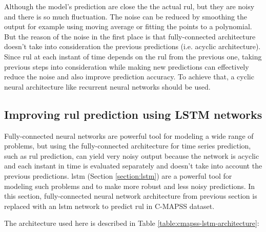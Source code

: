 Although the model's prediction are close the the actual \acrshort{rul}, but they are noisy and there is so much fluctuation. The noise can be reduced by smoothing the output for example using moving average or fitting the points to a polynomial. But the reason of the noise in the first place is that fully-connected architecture doesn't take into consideration the previous predictions (i.e. acyclic architecture). Since \acrshort{rul} at each instant of time depends on the \acrshort{rul} from the previous one, taking previous steps into consideration while making new predictions can effectively reduce the noise and also improve prediction accuracy. To achieve that, a cyclic neural architecture like recurrent neural networks should be used.

\subsection{Improving \acrshort{rul} prediction using LSTM networks}
Fully-connected neural networks are powerful tool for modeling a wide range of problems, but using the fully-connected architecture for time series prediction, such as \acrshort{rul} prediction, can yield very noisy output because the network is acyclic and each instant in time is evaluated separately and doesn't take into account the previous predictions. \acrlong{lstm} (Section \ref{section:lstm}) are a powerful tool for modeling such problems and to make more robust and less noisy predictions. In this section, fully-connected neural network architecture from previous section is replaced with an \acrshort{lstm} network to predict \acrshort{rul} in C-MAPSS dataset.

The architecture used here is described in Table \ref{table:cmapss-lstm-architecture}:

